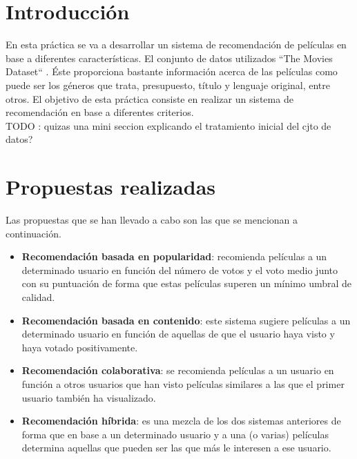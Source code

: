 \tableofcontents %


\newpage

	\section{Introducción}
	
		En esta práctica se va a desarrollar un sistema de recomendación de películas en base a diferentes características. El conjunto de datos utilizados ``The Movies Dataset`` \cite{c1}. Éste proporciona bastante información acerca de las películas como puede ser los géneros que trata, presupuesto, título y lenguaje original, entre otros. El objetivo de esta práctica consiste en realizar un sistema de recomendación en base a diferentes criterios. \\
		
		
		
	TODO : quizas una mini seccion explicando el tratamiento inicial del cjto de datos?
			
	\section{Propuestas realizadas}
	
		Las propuestas que se han llevado a cabo son las que se mencionan a continuación.
		
		\begin{itemize}
			\item \textbf{Recomendación basada en popularidad}: recomienda películas a un determinado usuario en función del número de votos y el voto medio junto con su puntuación de forma que estas películas superen un mínimo umbral de calidad.
			\item \textbf{Recomendación basada en contenido}: este sistema sugiere películas a un determinado usuario en función de aquellas de que el usuario haya visto y haya votado positivamente.
			\item \textbf{Recomendación colaborativa}: se recomienda películas a un usuario en función a otros usuarios que han visto películas similares a las que el primer usuario también ha visualizado.
			\item \textbf{Recomendación híbrida}: es una mezcla de los dos sistemas anteriores de forma que en base a un determinado usuario y a una (o varias) películas determina aquellas que pueden ser las que más le interesen a ese usuario.
		\end{itemize}	
	
